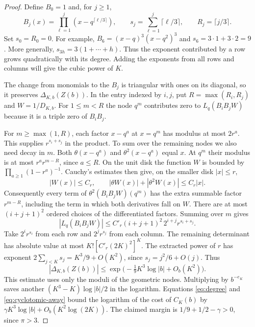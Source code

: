 \documentclass[11pt,letterpaper]{article}
\numberwithin{equation}{section}
\begin{document}
\begin{proof}
Define \(B_0=1\) and, for \(j\ge1\),
\[
 B_j(x)=\prod_{\ell=1}^j(x-q^{\lceil\ell/3\rceil}),\qquad
 s_j=\sum_{\ell=1}^j\lceil\ell/3\rceil,\qquad R_j=\lceil j/3\rceil.
\]
Set \(s_0=R_0=0\). For example, \(B_6=(x-q)^3(x-q^2)^3\) and
\(s_6=3\cdot1+3\cdot2=9\). More generally,
\(s_{3h}=3(1+\cdots+h)\). Thus the exponent contributed by a row
grows quadratically with its degree. Adding the exponents from all
rows and columns will give the cubic power of \(K\).

The change from monomials to the \(B_j\) is
triangular with ones on its diagonal, so it preserves
\(\Delta_{K,b}(Z(b))\). In the entry indexed by \(i,j\), put
\(R=\max(R_i,R_j)\) and \(W=1/D_{K,b}\). For \(1\le m<R\)
the node \(q^m\) contributes zero to \(L_q(B_iB_jW)\) because it
is a triple zero of \(B_iB_j\).

For \(m\ge\max(1,R)\), each factor \(x-q^a\) at \(x=q^m\) has
modulus at most \(2r^a\). This supplies \(r^{s_i+s_j}\) in the
product. To sum over the remaining nodes we also need decay in \(m\).
Both \(\theta(x-q^a)\) and \(\theta^2(x-q^a)\) equal \(x\).
At \(q^m\) their modulus is at most \(r^a r^{m-R}\), since \(a\le R\).
On the unit disk the function \(W\) is bounded
by \(\prod_{a\ge1}(1-r^a)^{-1}\). Cauchy's estimates then give, on
the smaller disk \(|x|\le r\),
\[
       |W(x)|\le C_r,\qquad
       |\theta W(x)|+|\theta^2W(x)|\le C_r |x|.
\]
Consequently every term of \(\theta^2(B_iB_jW)(q^m)\) has the
extra summable factor \(r^{m-R}\), including the term in which
both derivatives fall on \(W\). There are at most \((i+j+1)^2\)
ordered choices of the differentiated factors. Summing over \(m\)
gives
\[
       |L_q(B_iB_jW)|\le C'_r(i+j+1)^2\,2^{i+j}r^{s_i+s_j}.
\]
Take \(2^i r^{s_i}\) from each row and \(2^j r^{s_j}\) from each
column. The remaining determinant has absolute value at most
\(K![C'_r(2K)^2]^K\). The extracted power of \(r\) has exponent
\(2\sum_{j<K}s_j=K^3/9+O(K^2)\), since \(s_j=j^2/6+O(j)\). Thus
\begin{equation}\label{eq:rawdecay}
    |\Delta_{K,b}(Z(b))|
       \le \exp\bigl(-\tfrac19 K^3\log|b|+O_b(K^2)\bigr).
\end{equation}
This estimate uses only the moduli of the geometric nodes.
Multiplying by \(b^{-e_K}\) saves another \((K^3-K)\log|b|/2\)
in the logarithm. Equations \eqref{eq:degree} and
\eqref{eq:cyclotomic-away} bound the logarithm of the cost of
\(C_K(b)\) by \(\gamma K^3\log|b|+O_b(K^2\log(2K))\).
The claimed margin is \(1/9+1/2-\gamma>0\), since \(\pi>3\).
\end{proof}
\end{document}
